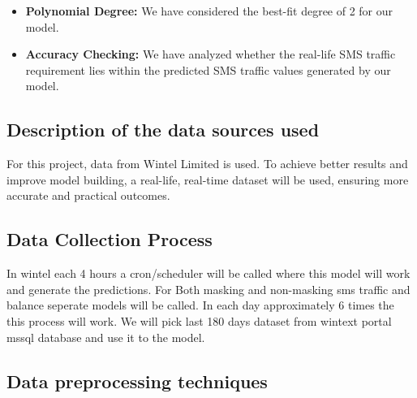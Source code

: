 \documentclass[12pt]{book} %
\begin{document}
\begin{itemize}
    \item \textbf{Polynomial Degree:} We have considered the best-fit degree of 2 for our model.
    \item \textbf{Accuracy Checking:} We have analyzed whether the real-life SMS traffic requirement lies within the predicted SMS traffic values generated by our model.
\end{itemize}



\subsection{Description of the data sources used}
For this project, data from Wintel Limited is used. To achieve better results and improve model building, a real-life, real-time dataset will be used, ensuring more accurate and practical outcomes.

\subsection{Data Collection Process}
In wintel each 4 hours a cron/scheduler will be called where this model will work and generate the predictions. For Both masking and non-masking sms traffic and balance seperate models will be called. In each day approximately 6 times the this process will work. We will pick last 180 days dataset from wintext portal mssql database and use it to the model.

\subsection{Data preprocessing techniques}
\end{document}
